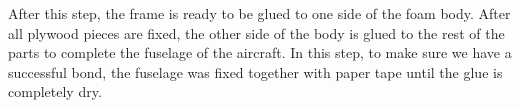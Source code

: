 \documentclass[12pt]{article}
\begin{document}
% 
\FloatBarrier
\justify
After this step, the frame is ready to be glued to one side of the foam body. After all plywood pieces are fixed, the other side of the body is glued to the rest of the parts to complete the fuselage of the aircraft. In this step, to make sure we have a successful bond, the fuselage was fixed together with paper tape until the glue is completely dry.

\end{document}
